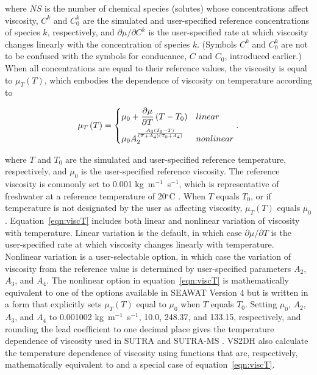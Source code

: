 \noindent where $NS$ is the number of chemical species (solutes) whose concentrations affect viscosity, $C^k$ and $C_{0}^k$ are the simulated and user-specified reference concentrations of species $k$, respectively, and $\partial \mu / \partial C^k$ is the user-specified rate at which viscosity changes linearly with the concentration of species $k$. (Symbols $C^k$ and $C_{0}^k$ are not to be confused with the symbols for conducance, $C$ and $C_0$, introduced earlier.) When all concentrations are equal to their reference values, the viscosity is equal to $\mu_T \left ( T \right )$, which embodies the dependence of viscosity on temperature according to

\begin{align}
	\label{eqn:viscT}
	 \mu_T \left ( T \right ) = \begin{dcases}
		\mu_{0} + \frac{\partial \mu} {\partial T} \left ( T - T_{0}\right ) & linear \\
		\mu_{0} A_2^{\frac{A_3 \left ( T_0 - T \right )} {\left ( T + A_4 \right ) \left ( T_0 + A_4 \right ) }} & nonlinear
	\end{dcases} .
\end{align}

\noindent where $T$ and $T_{0}$ are the simulated and user-specified reference temperature, respectively, and $\mu_{0}$ is the user-specified reference viscosity. The reference viscosity is commonly set to 0.001 kg~m$^{-1}$~s$^{-1}$, which is representative of freshwater at a reference temperature of 20$^{\circ}$C \citep[Table 11.1]{maidment1993}. When $T$ equals $T_{0}$, or if temperature is not designated by the user as affecting viscosity, $\mu_T \left ( T \right )$ equals $\mu_{0}$. Equation~\ref{eqn:viscT} includes both linear and nonlinear variation of viscosity with temperature. Linear variation is the default, in which case $\partial \mu / \partial T$ is the user-specified rate at which viscosity changes linearly with temperature. Nonlinear variation is a user-selectable option, in which case the variation of viscosity from the reference value is determined by user-specified parameters $A_2$, $A_3$, and $A_4$. The nonlinear option in equation~\ref{eqn:viscT} is mathematically equivalent to one of the options available in SEAWAT Version 4 \citep[equation 18]{langevin2002seawat} but is written in a form that explicitly sets $\mu_T \left ( T \right )$ equal to $\mu_{0}$ when $T$ equals $T_{0}$. Setting $\mu_0$, $A_2$, $A_3$, and $A_4$ to 0.001002 kg~m$^{-1}$~s$^{-1}$, 10.0, 248.37, and 133.15, respectively, and rounding the lead coefficient to one decimal place gives the temperature dependence of viscosity used in SUTRA \citep{Voss1984sutra} and SUTRA-MS \citep{hughes2004}. VS2DH \citep{healy1996} also calculate the temperature dependence of viscosity using functions that are, respectively, mathematically equivalent to and a special case of equation~\ref{eqn:viscT}.

